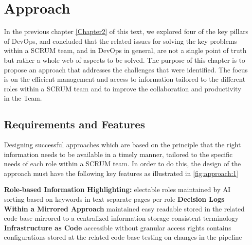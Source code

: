 


\chapter{Approach}

\label{Chapter4} %

In the previous chapter \ref{Chapter2} of this text, we explored four of the key pillars of \ac{DevOps}, and concluded that the related issues for solving the key problems within a \ac{SCRUM} team, and in \ac{DevOps} in general, are not a single point of truth but rather a whole web of aspects to be solved. The purpose of this chapter is to propose an approach that addresses the challenges that were identified. The focus is on the efficient management and access to information tailored to the different roles within a \ac{SCRUM} team and to improve the collaboration and productivity in the Team.


\section{Requirements and Features}

Designing successful approaches which are based on the principle that the right information needs to be available in a timely manner, tailored to the specific needs of each role within a \ac{SCRUM} team. In order to do this, the design of the approach must have the following key features as illustrated in \ref{fig:approach:1}

\begin{outline}
    \1 \textbf{Role-based Information Highlighting:}
    \2 electable roles
    \2 maintained by \ac{AI}
    \2 sorting based on keywords in text
    \2 separate pages per role
    \1 \textbf{Decision Logs Within a Mirrored Approach}
    \2 maintained
    \2 easy readable
    \2 stored in the related code base
    \2 mirrored to a centralized information storage
    \2 consistent terminology
    \1 \textbf{Infrastructure as Code}
    \2 accessible without granular access rights
    \2 contains configurations
    \2 stored at the related code base
    \2 testing on changes in the pipeline
\end{outline}

